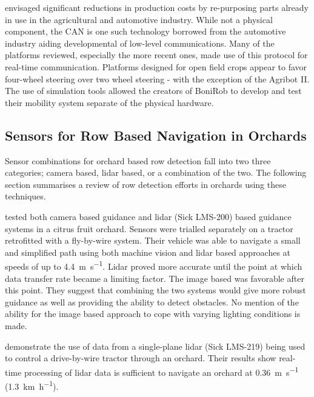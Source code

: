 \documentclass[preprint,authoryear,12pt]{elsarticle}
\begin{document}
        \cite{Blackmore2007} envisaged significant reductions in production costs by re-purposing parts already in use in the agricultural and automotive industry.
        While not a physical component, the CAN is one such technology borrowed from the automotive industry aiding developmental of low-level communications.
        Many of the platforms reviewed, especially the more recent ones, made use of this protocol for real-time communication.
        Platforms designed for open field crops appear to favor four-wheel steering over two wheel steering - with the exception of the Agribot II.
        The use of simulation tools allowed the creators of BoniRob to develop and test their mobility system separate of the physical hardware.


    \subsection{Sensors for Row Based Navigation in Orchards}

        Sensor combinations for orchard based row detection fall into two three categories; camera based, lidar based, or a combination of the two.
        The following section summarises a review of row detection efforts in orchards using these techniques.

        \cite{Subramanian2006} tested both camera based guidance and lidar (Sick LMS-200) based guidance systems in a citrus fruit orchard.
        Sensors were trialled separately on a tractor retrofitted with a fly-by-wire system.
        Their vehicle was able to navigate a small and simplified path using both machine vision and lidar based approaches at speeds of up to \SI{4.4}{\meter\per\second}.
        Lidar proved more accurate until the point at which data transfer rate became a limiting factor.
        The image based was favorable after this point.
        They suggest that combining the two systems would give more robust guidance as well as providing the ability to detect obstacles.
        No mention of the ability for the image based approach to cope with varying lighting conditions is made.

        \cite{Barawid2007} demonstrate the use of data from a single-plane lidar (Sick LMS-219) being used to control a drive-by-wire tractor through an orchard.
        Their results show real-time processing of lidar data is sufficient to navigate an orchard at \SI{0.36}{\meter\per\second} (\SI{1.3}{\kilo\meter\per\hour}).
\end{document}
